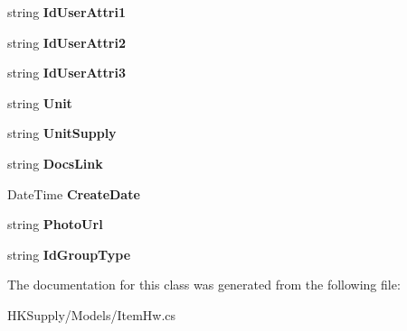 \begin{DoxyCompactItemize}
\item 
\mbox{\label{class_h_k_supply_1_1_models_1_1_item_hw_ade3f813af262976b8f68f73bb596a728}} 
string {\bfseries Id\+User\+Attri1}
\item 
\mbox{\label{class_h_k_supply_1_1_models_1_1_item_hw_ac93187e7ea866a7a4bad9b873188246a}} 
string {\bfseries Id\+User\+Attri2}
\item 
\mbox{\label{class_h_k_supply_1_1_models_1_1_item_hw_aead1d4f9fd5959383b683f46dda25715}} 
string {\bfseries Id\+User\+Attri3}
\item 
\mbox{\label{class_h_k_supply_1_1_models_1_1_item_hw_a06a6c43d2c65b2a8fc8c23f8aa9fa7fa}} 
string {\bfseries Unit}
\item 
\mbox{\label{class_h_k_supply_1_1_models_1_1_item_hw_a7e7e43bb7364edd34e417123d29a4ab9}} 
string {\bfseries Unit\+Supply}
\item 
\mbox{\label{class_h_k_supply_1_1_models_1_1_item_hw_a6cdd5e7ba1b5c49b354f788b7a41bb81}} 
string {\bfseries Docs\+Link}
\item 
\mbox{\label{class_h_k_supply_1_1_models_1_1_item_hw_a1dca4deace7718f4acee59b5112b2364}} 
Date\+Time {\bfseries Create\+Date}
\item 
\mbox{\label{class_h_k_supply_1_1_models_1_1_item_hw_a928650d2465b1bd2a9d759d6c32450a9}} 
string {\bfseries Photo\+Url}
\item 
\mbox{\label{class_h_k_supply_1_1_models_1_1_item_hw_a5f38f772ca5ab381d6b4afab488bc9d6}} 
string {\bfseries Id\+Group\+Type}
\end{DoxyCompactItemize}


The documentation for this class was generated from the following file\+:\begin{DoxyCompactItemize}
\item 
H\+K\+Supply/\+Models/Item\+Hw.\+cs\end{DoxyCompactItemize}
